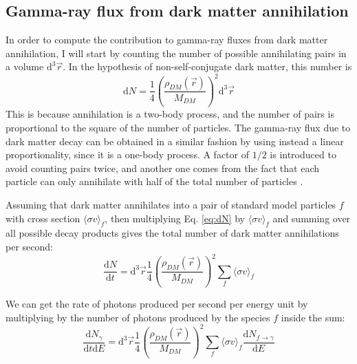 \subsection{Gamma-ray flux from dark matter annihilation}
In order to compute the contribution to gamma-ray fluxes from dark matter annihilation, I will start by counting the number of possible annihilating pairs in a volume \(\mathrm{d}^3 \vec{r}\). In the hypothesis of non-self-conjugate dark matter, this number is
\begin{equation}\label{eq:dN}
	\mathrm{d} N = \frac{1}{4} \left( \frac{\rho_{DM} (\vec{r})}{M_{DM} } \right) ^2 \mathrm{d}^3 \vec{r}
\end{equation}
This is because annihilation is a two-body process, and the number of pairs is proportional to the square of the number of particles. The gamma-ray flux due to dark matter decay can be obtained in a similar fashion by using instead a linear proportionality, since it is a one-body process. A factor of \(1 /2\) is introduced to avoid counting pairs twice, and another one comes from the fact that each particle can only annihilate with half of the total number of particles \cite{Sala_2019}.

Assuming that dark matter annihilates into a pair of standard model particles \(f\) with cross section \(\langle \sigma v \rangle_f \), then multiplying Eq. \eqref{eq:dN} by \(\langle \sigma v \rangle_f \) and summing over all possible decay products gives the total number of dark matter annihilations per second:
\begin{equation}
	\frac{\mathrm{d}N}{\mathrm{d}t} = \mathrm{d} ^3 \vec{r} \frac{1}{4} \left( \frac{\rho_{DM} (\vec{r})}{M_{DM} } \right)^2 \sum_{f} \langle \sigma v \rangle_f
\end{equation}

We can get the rate of photons produced per second per energy unit by multiplying by the number of photons produced by the species \(f\) inside the sum:
\begin{equation}
	\frac{\mathrm{d}N_{\gamma } }{\mathrm{d}t \mathrm{d} E} = \mathrm{d} ^3 \vec{r} \frac{1}{4} \left( \frac{\rho_{DM} (\vec{r})}{M_{DM} } \right)^2 \sum_{f} \langle \sigma v \rangle_f \frac{\mathrm{d}N_{f \to \gamma } }{\mathrm{d}E}
\end{equation}

